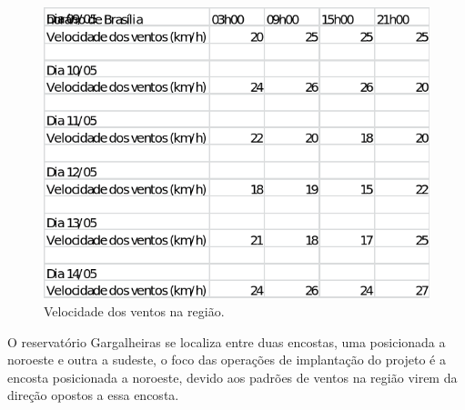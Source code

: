     \begin{figure}[h]
    \begin{center}
      \includegraphics[scale=0.6]{editaveis/figuras/velocidade_ventos}
      \caption[Velocidade dos ventos na região]{Velocidade dos ventos na região. \footnotemark}
      \label{velocidade_ventos}
    \end{center}
    \end{figure}
    \FloatBarrier
    
    O reservatório Gargalheiras se localiza entre duas encostas, uma posicionada a noroeste e outra a sudeste, o foco das
    operações de implantação do projeto é a encosta posicionada a noroeste, devido aos padrões de ventos na região virem da 
    direção opostos a essa encosta.
    
